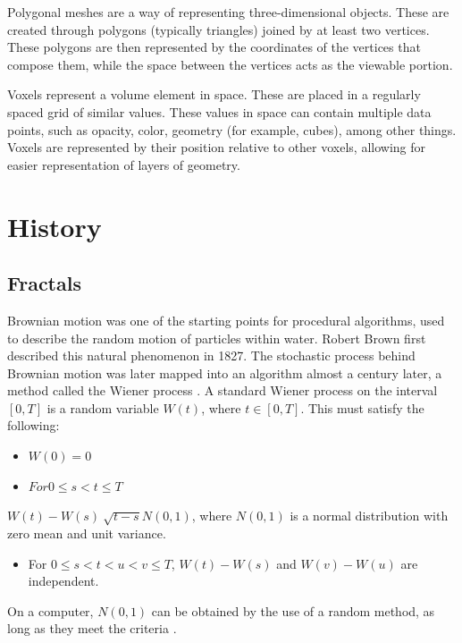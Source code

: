 \documentclass[10pt]{report}
\begin{document}
		Polygonal meshes are a way of representing three-dimensional objects. These are created through polygons (typically triangles) joined by at least two vertices. These polygons are then represented by the coordinates of the vertices that compose them, while the space between the vertices acts as the viewable portion.
		
		Voxels represent a volume element in space. These are placed in a regularly spaced grid of similar values. These values in space can contain multiple data points, such as opacity, color, geometry (for example, cubes), among other things. Voxels are represented by their position relative to other voxels, allowing for easier representation of layers of geometry. 
		
	\vspace{10pt}
	\let\clearpage\relax
	\chapter{History}
	
		\section{Fractals}
		Brownian motion was one of the starting points for procedural algorithms, used to describe the random motion of particles within water. Robert Brown first described this natural phenomenon in 1827. The stochastic process behind Brownian motion was later mapped into an algorithm almost a century later, a method called the Wiener process \cite{inbook}. A standard Wiener process on the interval \([0,T]\) is a random variable \(W(t)\), where \(t \in [0,T]\). This must satisfy the following:
		
		\begin{itemize}
			\item \(W(0) = 0\)
			\item \(For 0 \leq s < t \leq T\) 
		\end{itemize}
		
		\(W(t) - W(s) ~ \sqrt{t - s} N(0,1)\), where \(N(0,1)\) is a normal distribution with zero mean and unit variance. 
		
		\begin{itemize}
			\item For \( 0 \leq s < t < u < v \leq T\), \(W(t) - W(s)\) and \(W(v) - W(u)\) are independent.
		\end{itemize}
	
		On a computer, \(N(0,1)\) can be obtained by the use of a random method, as long as they meet the criteria \cite{wiener-process}. 
		
\end{document}
